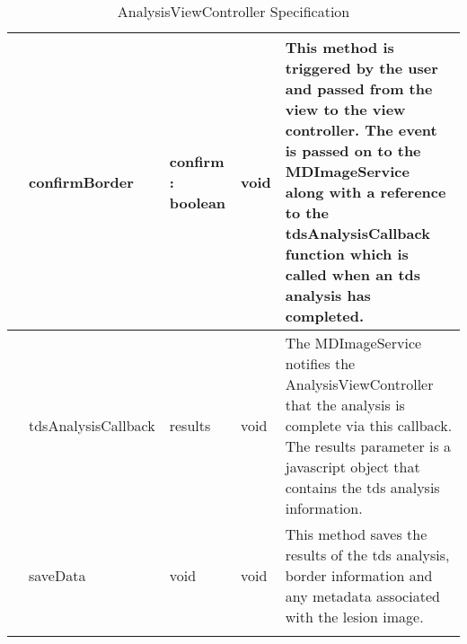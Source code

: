 {\begin{longtable}[H]{  | >{\bfseries}p{2cm} | p{2.2cm} | p{1.5cm} | p{1.5cm} | p{4cm} | }
        & confirmBorder & confirm : boolean & void
        & This method is triggered by the user and passed from the view to the view controller. The event is passed on to the MDImageService along with a reference to the tdsAnalysisCallback function which is called when an tds analysis has completed.
        \\ \hline
        & tdsAnalysisCallback & results & void
        & The MDImageService notifies the AnalysisViewController that the analysis is complete via this callback. The results parameter is a javascript object that contains the tds analysis information.
        \\ \hline
        & saveData & void & void
        & This method saves the results of the tds analysis, border information and any metadata associated with the lesion image.
        \\ \hline

    \caption{AnalysisViewController Specification}
    \label{fig:analysis_controller}
\end{longtable}
}